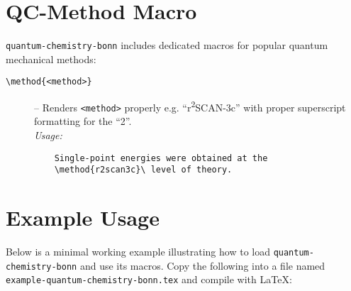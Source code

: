 \documentclass[a4paper,12pt]{article}
\begin{document}
\section{QC-Method Macro}
\label{sec:qcmethods}
\texttt{quantum-chemistry-bonn} includes  dedicated macros for popular quantum mechanical methods:

\begin{description}
    \item[\texttt{\textbackslash method\{<method>\}}] – Renders \texttt{<method>} properly e.g. “r\textsuperscript{2}SCAN-3c” with proper superscript formatting for the “2”.\\
    \textit{Usage:}
    \begin{verbatim}
    Single-point energies were obtained at the
    \method{r2scan3c}\ level of theory.
    \end{verbatim}
\end{description}

\section{Example Usage}
\label{sec:example}
Below is a minimal working example illustrating how to load \texttt{quantum-chemistry-bonn} and use its macros. Copy the following into a file named \texttt{example-quantum-chemistry-bonn.tex} and compile with \LaTeX:
\end{document}
